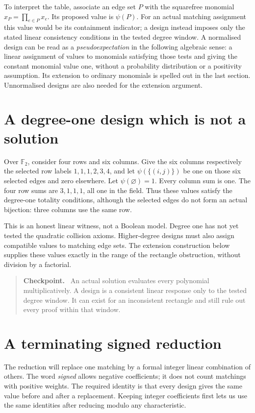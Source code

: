 \documentclass[11pt,a4paper,oneside,openany]{book}
\theoremstyle{definition}\newtheorem{definition}[theorem]{Definition}
\theoremstyle{remark}\newtheorem{remark}[theorem]{Remark}
\newenvironment{checkpoint}{\begin{quote}\small\textbf{Checkpoint.}\ }{\end{quote}}
\numberwithin{equation}{chapter}
\begin{document}
To interpret the table, associate an edge set $P$ with the squarefree
monomial $x_P=\prod_{e\in P}x_e$. Its proposed value is $\psi(P)$.
For an actual matching assignment this value would be its containment
indicator; a design instead imposes only the stated linear consistency
conditions in the tested degree window. A normalised design can be read
as a \emph{pseudoexpectation} in the following algebraic sense: a linear
assignment of values to monomials satisfying those tests and giving the
constant monomial value one, without a probability distribution or a
positivity assumption. Its extension to ordinary monomials is spelled
out in the last section. Unnormalised designs are also needed for the
extension argument.

\section{A degree-one design which is not a solution}
Over $\mathbb F_2$, consider four rows and six columns. Give the six
columns respectively the selected row labels $1,1,1,2,3,4$, and let
$\psi(\{(i,j)\})$ be one on those six selected edges and zero elsewhere.
Let $\psi(\varnothing)=1$. Every column sum is one. The four row
sums are $3,1,1,1$, all one in the field. Thus these values satisfy the
degree-one totality conditions, although the selected edges do not form
an actual bijection: three columns use the same row.

This is an honest linear witness, not a Boolean model. Degree one has
not yet tested the quadratic collision axioms. Higher-degree designs
must also assign compatible values to matching edge sets. The extension
construction below supplies these values exactly in the range of the
rectangle obstruction, without division by a factorial.

\begin{checkpoint}
An actual solution evaluates every polynomial multiplicatively. A design
is a consistent linear response only to the tested degree window. It
can exist for an inconsistent rectangle and still rule out every proof
within that window.
\end{checkpoint}

\section{A terminating signed reduction}
The reduction will replace one matching by a formal integer linear
combination of others. The word \emph{signed} allows negative
coefficients; it does not count matchings with positive weights.
The required identity is that every design gives the same value before
and after a replacement. Keeping integer coefficients first lets us
use the same identities after reducing modulo any characteristic.
\end{document}

